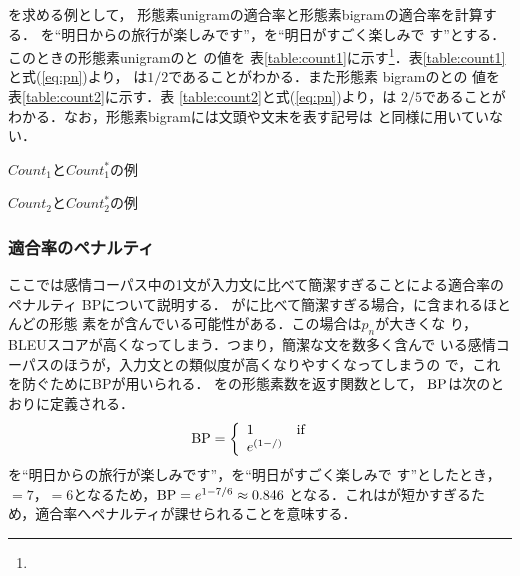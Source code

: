 \documentclass[japanese]{jnlp_1.4}
\def\resp#1{}
\def\respeqn#1{}
\begin{document}
\resp{{$p_{n}(\cdot)$}}を求める例として，
形態素unigramの適合率\resp{{$p_{1}(x,s)$}}と形態素bigramの適合率\resp{{$p_{2}(x,s)$}}を計算する．
\respeqn{$x$}を``明日からの旅行が楽しみです''，\respeqn{$s$}を``明日がすごく楽しみで
す''とする．このときの形態素unigramの\resp{{$Count_{1}(\cdot)$}}と
\resp{{$Count^{*}_{1}(\cdot)$}}の値を
表\ref{table:count1}に示す\footnote{\resp{本稿では形態素を``形態素の文字列
/品詞''の形式で表記する．}}．表\ref{table:count1}と式(\ref{eq:pn})より，
\resp{{$p_{1}(x,s)$}}は$1/2$であることがわかる．また形態素
bigramの\resp{{$Count_{2}(\cdot)$}}と\resp{{$Count^{*}_{2}(\cdot)$}}の
値を表\ref{table:count2}に示す．表
\ref{table:count2}と式(\ref{eq:pn})より，\resp{{$p_{2}(x,s)$}}は
$2/5$であることがわかる．なお，形態素bigramには文頭や文末を表す記号は
\cite{bleu}と同様に用いていない．

 \begin{table}[t]
 \caption{$Count_{1}とCount^{*}_{1}$の例}
 \label{table:count1}

\end{table}
\begin{table}[t]
 \caption{$Count_{2}とCount^{*}_{2}$の例}
 \label{table:count2}

\end{table}


\subsubsection{適合率のペナルティ}

ここでは感情コーパス中の1文\respeqn{$s$}が入力文\respeqn{$x$}に比べて簡潔すぎることによる適合率のペナルティ
BPについて説明する．
\respeqn{$s$}が\respeqn{$x$}に比べて簡潔すぎる場合，\respeqn{$s$}に含まれるほとんどの形態
素を\respeqn{$x$}が含んでいる可能性がある．この場合は$p_{n}$が大きくな
り，BLEUスコアが高くなってしまう．つまり，簡潔な文を数多く含んで
いる感情コーパスのほうが，入力文との類似度が高くなりやすくなってしまうの
で，これを防ぐためにBPが用いられる．
\resp{{$g(x)$}}を\resp{{$x$}}の形態素数を返す関数として，
${\rm BP}$は次のとおりに定義される．
\begin{equation}
{\rm BP} = \left\{
	\begin{array}{lll}
	 1 & {\rm if} & \respeqn{g(x) < g(s)} \\
	 e^{(1 - \respeqn{g(x)} / \respeqn{g(s)})} & & \respeqn{{\rm otherwise}} \\
	\end{array}
	\right. \label{eq:bp}
\end{equation}
\respeqn{$x$}を``明日からの旅行が楽しみです''，\respeqn{$s$}を``明日がすごく楽しみで
す''としたとき，$\respeqn{g(x)} = 7$，$\respeqn{g(s)} = 6$となるため，${\rm BP} = e^{1 - 7/6} \approx 0.846$
となる．これは\respeqn{$s$}が短かすぎるため，適合率へペナルティが課せられることを意味する．
\end{document}
